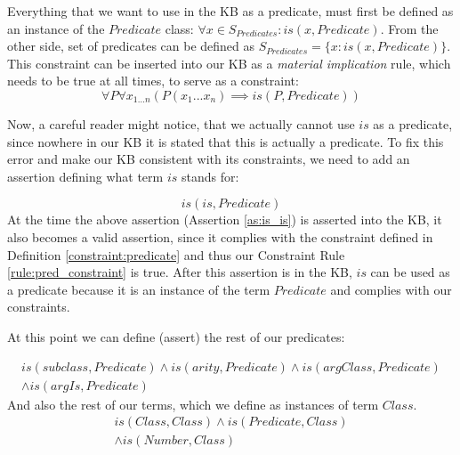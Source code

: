 \begin{definition}\label{constraint:predicate}
Everything that we want to use in the KB as a predicate, must first be defined
as an instance of the $Predicate$ class:
$\forall x \in S_{Predicates}: is(x,Predicate)$. From the other side, set of
predicates can be defined as $S_{Predicates}=\{x:is(x,Predicate)\}$.
This constraint can be inserted into our KB as a \emph{material implication}
rule, which needs to be true at all times, to serve as a constraint:
\begin{equation}\label{rule:pred_constraint}
\forall P \forall x_{1...n} (P(x_1...x_n) \implies is(P,Predicate))
\end{equation}
\end{definition}

Now, a careful reader might notice, that we actually cannot use $is$ as a 
predicate, since nowhere in our KB it is stated that this is actually a 
predicate. To fix this error and make our KB consistent with its constraints,
we need to add an assertion defining what term $is$ stands for:

\begin{equation}\label{as:is_is}
is(is, Predicate)
\end{equation}
At the time the above assertion (Assertion \ref{as:is_is}) is asserted
into the KB, it also becomes a valid assertion, since it complies with the
constraint defined in Definition \ref{constraint:predicate} and thus our
Constraint Rule \ref{rule:pred_constraint} is true. After this 
assertion is in the KB, $is$ can be used as a predicate because it is an 
instance of the term $Predicate$ and complies with our constraints. 

At this point we can define (assert) the rest of our predicates:

\begin{equation}\label{as:predicates}
\begin{gathered}
is(subclass, Predicate) \land is(arity,Predicate) \land is(argClass,Predicate)\\
\land is(argIs,Predicate)
\end {gathered}
\end{equation}
And also the rest of our terms, which we define as instances of term $Class$.
\begin{equation}\label{as:is_class}
\begin{gathered}
	is(Class,Class) \land is(Predicate,Class)\\ 
\land is(Number, Class)
\end {gathered}
\end{equation}

